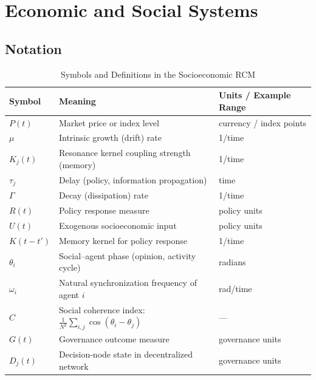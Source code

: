 \section{Economic and Social Systems}

\subsection{Notation}
\begin{table}[ht]
  \centering
  \caption{Symbols and Definitions in the Socioeconomic RCM}
  \label{tab:eco_notation}
  \begin{tabular}{@{}lll@{}}
    \toprule
    Symbol & Meaning                                          & Units / Example Range \\
    \midrule
    $P(t)$        & Market price or index level                      & currency / index points \\
    $\mu$         & Intrinsic growth (drift) rate                    & 1/time                  \\
    $K_j(t)$      & Resonance kernel coupling strength (memory)      & 1/time                  \\
    $\tau_j$      & Delay (policy, information propagation)          & time                    \\
    $\Gamma$      & Decay (dissipation) rate                         & 1/time                  \\
    $R(t)$        & Policy response measure                          & policy units            \\
    $U(t)$        & Exogenous socioeconomic input                    & policy units            \\
    $K(t-t')$     & Memory kernel for policy response                & 1/time                  \\
    $\theta_i$    & Social–agent phase (opinion, activity cycle)     & radians                 \\
    $\omega_i$    & Natural synchronization frequency of agent $i$   & rad/time                \\
    $C$           & Social coherence index: $\frac1{N^2}\sum_{i,j}\cos(\theta_i-\theta_j)$ & —           \\
    $G(t)$        & Governance outcome measure                       & governance units        \\
    $D_j(t)$      & Decision‐node state in decentralized network     & governance units        \\
    \bottomrule
  \end{tabular}
\end{table}

